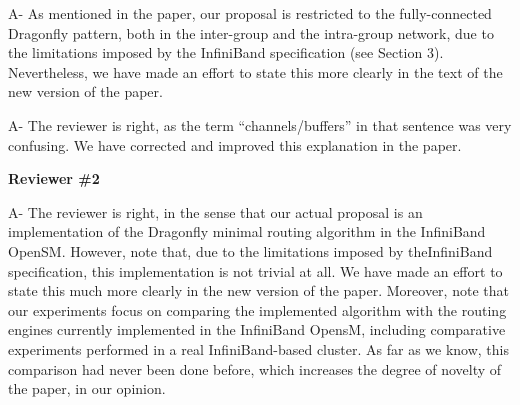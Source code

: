 \documentclass[a4paper,10pt]{letter}
\newcommand{\dfly}{Dragonfly}
\newcommand{\iba}{InfiniBand}
\begin{document}
\begin{letter}

A- As mentioned in the paper, our proposal is
restricted to the fully-connected \dfly{} pattern, both in the inter-group and the intra-group network, due to the limitations imposed by the \iba{} specification (see Section 3). Nevertheless, we have made an effort to state this more clearly in the text of the new version of the paper.



A- The reviewer is right, as the term ``channels/buffers'' in that sentence was very confusing. We have corrected and improved this explanation in the paper.

\clearpage

{\bf Reviewer \#2}


A- The reviewer is right, in the sense that our actual proposal is an implementation of the \dfly{} minimal
routing algorithm in the \iba{} OpenSM. However, note that, due to the limitations imposed by the\iba{} specification, this implementation is not trivial at all.
We have made an effort to state this much more clearly in the new version of the paper. Moreover, note that our experiments focus on comparing the implemented algorithm with the routing engines currently implemented in the \iba{} OpensM, including comparative experiments performed in a real \iba{}-based cluster. As far as we know, this comparison had never been done before, which increases the degree of novelty of the paper, in our opinion.   



\end{letter}
\end{document}
